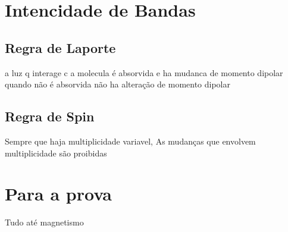 \documentclass[12pt]{article}
\begin{document}
\section{Intencidade de Bandas}

\begin{multicols}{2}

\subsection{Regra de Laporte}
a luz q interage c a molecula é absorvida e ha mudanca de momento dipolar\\
quando não é absorvida não ha alteração de momento dipolar

\subsection{Regra de Spin}
Sempre que haja multiplicidade variavel, As mudanças que envolvem multiplicidade são proibidas

\end{multicols}

\section{Para a prova}
Tudo até magnetismo
\end{document}

